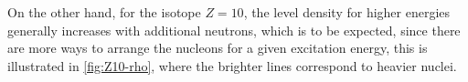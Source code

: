 On the other hand, for the isotope $Z=10$, the level density for higher energies generally increases with additional neutrons, which is to be expected, since there are more ways to arrange the nucleons for a given excitation energy, this is illustrated in \autoref{fig:Z10-rho}, where the brighter lines correspond to heavier nuclei.
\clearpage
{}
